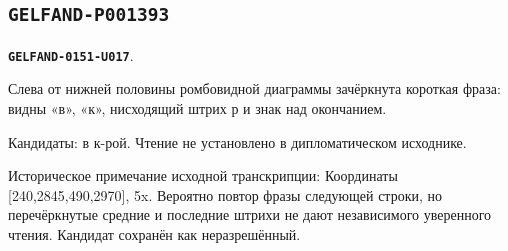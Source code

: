 \documentclass[11pt]{article}
\theoremstyle{definition}
\theoremstyle{remark}
\begin{document}
\subsection*{\texttt{GELFAND-P001393}}
\par\noindent\leavevmode{}\label{GELFAND-0151-U017}\label{GELFAND-P001393:cancelled-left:note}\textbf{\texttt{GELFAND-0151-U017}}.\nopagebreak[4]\par
Слева от нижней половины ромбовидной диаграммы зачёркнута короткая фраза: видны «в», «к», нисходящий штрих р и знак над окончанием.\par
Кандидаты: в к-рой. Чтение не установлено в дипломатическом исходнике.\par
Историческое примечание исходной транскрипции: Координаты [240,2845,490,2970], 5x. Вероятно повтор фразы следующей строки, но перечёркнутые средние и последние штрихи не дают независимого уверенного чтения. Кандидат сохранён как неразрешённый.\par\medskip
\end{document}
